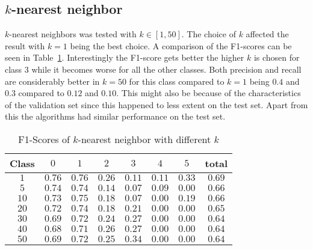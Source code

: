\subsection{$k$-nearest neighbor}
$k$-nearest neighbors was tested with $k \in [1,50]$. The choice of $k$ affected the result with $k=1$ being the best choice. A comparison of the F1-scores can be seen in Table~\ref{ds2:table:knnf1}. Interestingly the F1-score gets better the higher $k$ is chosen for class $3$ while it becomes worse for all the other classes. Both precision and recall are considerably better in $k=50$ for this class compared to $k=1$
being $0.4$ and $0.3$ compared to $0.12$ and $0.10$. This might also be because of the characteristics of the validation set since this happened to less extent on the test set. Apart from this the algorithms had similar performance on the test set.
\begin{table}[p]
	\begin{center}
		\begin{tabular}{|c|c|c|c|c|c|c|c|}
\hline Class & $0$ & $1$ & $2$ & $3$ &$4$  &$ 5$ & total \\
\hline $1$ & $0.76$ & $0.76$ & $0.26$ & $0.11$ & $0.11$ & $0.33$ & $0.69$ \\
\hline $5$ & $0.74$ & $0.74$ & $0.14$ & $0.07$ & $0.09$ & $0.00$ & $0.66$ \\
\hline $10$ & $0.73$ & $0.75$ &$0.18$ & $0.07$ & $0.00$ & $0.19$ & $0.66$ \\
\hline $20$ & $0.72$ & $0.74$ &$0.18$ & $0.21$ & $0.00$ &	$0.00$ & $0.65$ \\
\hline $30$ & $0.69$ & $0.72$ &$0.24$ & $0.27$ & $0.00$ & $0.00$ & $0.64$ \\
\hline $40$ & $0.68$ & $0.71$ &$0.26$ &	$0.27$ & $0.00$ & $0.00$ & $0.64$ \\
\hline $50$ & $0.69$ & $0.72$ &$0.25$ & $0.34$ & $0.00$ & $0.00$ & $0.64$ \\
\hline
	\end{tabular}
	\end{center}
	\caption{F1-Scores of $k$-nearest neighbor with different $k$\label{ds2:table:knnf1}}
\end{table}

